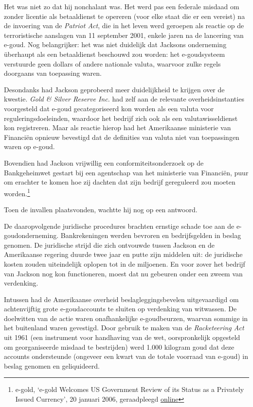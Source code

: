 \documentclass[smalldemyvopaper,11pt,twoside,onecolumn,openright,extrafontsizes,hidelinks]{memoir}
\begin{document}
Het was niet zo dat hij nonchalant was. Het werd pas een federale
misdaad om zonder licentie als betaaldienst te opereren (voor elke staat
die er een vereist) na de invoering van de \emph{Patriot Act}, die in
het leven werd geroepen als reactie op de terroristische aanslagen van
11 september 2001, enkele jaren na de lancering van e-goud. Nog
belangrijker: het was niet duidelijk dat Jacksons onderneming überhaupt
als een betaaldienst beschouwd zou worden: het e-goudsysteem verstuurde
geen dollars of andere nationale valuta, waarvoor zulke regels doorgaans
van toepassing waren.

Desondanks had Jackson geprobeerd meer duidelijkheid te krijgen over de
kwestie. \emph{Gold \& Silver Reserve Inc.} had zelf aan de relevante
overheidsinstanties voorgesteld dat e-goud gecategoriseerd kon worden
als een valuta voor reguleringsdoeleinden, waardoor het bedrijf zich ook
als een valutawisseldienst kon registreren. Maar als reactie hierop had
het Amerikaanse ministerie van Financiën opnieuw bevestigd dat de
definities van valuta niet van toepassingen waren op e-goud.

Bovendien had Jackson vrijwillig een conformiteitsonderzoek op de
Bankgeheimwet gestart bij een agentschap van het ministerie van
Financiën, puur om erachter te komen hoe zij dachten dat zijn bedrijf
gereguleerd zou moeten worden.\footnote{\hspace{0pt}e-gold, `e-gold
  Welcomes US Government Review of its Status as a Privately Issued
  Currency', 20 januari 2006, geraadpleegd
  \href{https://web.archive.org/web/20060304203618if_/http://www.e-gold.com/letter2.html.}{online}}

Toen de invallen plaatsvonden, wachtte hij nog op een antwoord.

De daaropvolgende juridische procedures brachten ernstige schade toe aan
de e-goudonderneming. Bankrekeningen werden bevroren en bedrijfsgelden
in beslag genomen. De juridische strijd die zich ontvouwde tussen
Jackson en de Amerikaanse regering duurde twee jaar en putte zijn
middelen uit: de juridische kosten zouden uiteindelijk oplopen tot in de
miljoenen. En voor zover het bedrijf van Jackson nog kon functioneren,
moest dat nu gebeuren onder een zweem van verdenking.

Intussen had de Amerikaanse overheid beslagleggingsbevelen uitgevaardigd
om achtenvijftig grote e-goudaccounts te sluiten op verdenking van
witwassen. De doelwitten van de actie waren onafhankelijke
e-goudbeurzen, waarvan sommige in het buitenland waren gevestigd. Door
gebruik te maken van de \emph{Racketeering Act} uit 1961 (een instrument
voor handhaving van de wet, oorspronkelijk opgesteld om georganiseerde
misdaad te bestrijden) werd 1.000 kilogram goud dat deze accounts
ondersteunde (ongeveer een kwart van de totale voorraad van e-goud) in
beslag genomen en geliquideerd.
\end{document}

